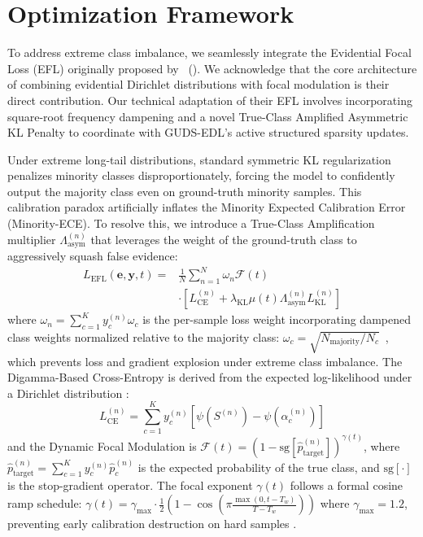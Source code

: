 \documentclass[letterpaper]{article} %
\begin{document}
\section{Optimization Framework}\label{sec:optimization}

To address extreme class imbalance, we seamlessly integrate the Evidential Focal Loss (EFL) originally proposed by \citeauthor{zhou2023domain}~(\citeyear{zhou2023domain}). We acknowledge that the core architecture of combining evidential Dirichlet distributions with focal modulation is their direct contribution. Our technical adaptation of their EFL involves incorporating square-root frequency dampening and a novel True-Class Amplified Asymmetric KL Penalty to coordinate with GUDS-EDL's active structured sparsity updates.

Under extreme long-tail distributions, standard symmetric KL regularization penalizes minority classes disproportionately, forcing the model to confidently output the majority class even on ground-truth minority samples. This calibration paradox artificially inflates the Minority Expected Calibration Error (Minority-ECE). To resolve this, we introduce a True-Class Amplification multiplier $\Lambda_{\text{asym}}^{(n)}$ that leverages the weight of the ground-truth class to aggressively squash false evidence:
\begin{equation}\label{eq:efl}
\begin{aligned}
    L_{\text{EFL}}(\bm{e}, \bm{y}, t) ={}& \frac{1}{N} \sum_{n=1}^N \omega_n \mathcal{F}(t) \\
    &\cdot \left[ L_{\text{CE}}^{(n)} + \lambda_{\text{KL}} \mu(t)
    \Lambda_{\text{asym}}^{(n)} L_{\text{KL}}^{(n)} \right]
\end{aligned}
\end{equation}
where $\omega_n = \sum_{c=1}^K y_c^{(n)} \omega_c$ is the per-sample loss weight incorporating dampened class weights normalized relative to the majority class: $\omega_c = \sqrt{N_{\text{majority}} / N_c}$~\cite{cui2019class}, which prevents loss and gradient explosion under extreme class imbalance. 
The Digamma-Based Cross-Entropy is derived from the expected log-likelihood under a Dirichlet distribution \cite{sensoy2018evidential}:
\begin{equation}
    L_{\text{CE}}^{(n)} = \sum_{c=1}^K y_c^{(n)} \left[\psi(S^{(n)}) - \psi(\alpha_c^{(n)})\right]
\end{equation}
and the Dynamic Focal Modulation is $\mathcal{F}(t) = (1 - \text{sg}[\hat{p}_{\text{target}}^{(n)}])^{\gamma(t)}$, where $\hat{p}_{\text{target}}^{(n)} = \sum_{c=1}^K y_c^{(n)} \hat{p}_c^{(n)}$ is the expected probability of the true class, and $\text{sg}[\cdot]$ is the stop-gradient operator. The focal exponent $\gamma(t)$ follows a formal cosine ramp schedule: $\gamma(t) = \gamma_{\text{max}} \cdot \frac{1}{2}\left(1 - \cos\left(\pi \frac{\max(0, t - T_w)}{T - T_w}\right)\right)$ where $\gamma_{\text{max}} = 1.2$, preventing early calibration destruction on hard samples \cite{lin2017focal}.
\end{document}
